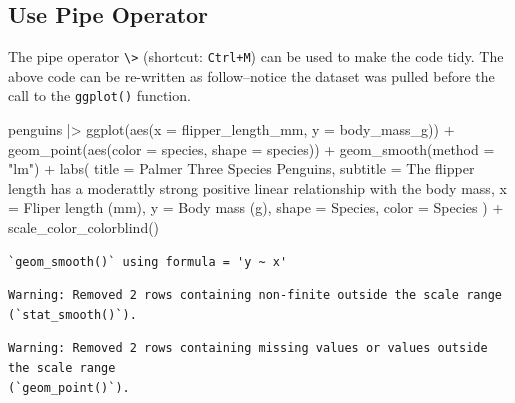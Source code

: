 \documentclass[
  letterpaper,
  DIV=11,
  numbers=noendperiod]{scrreprt}
\newenvironment{Shaded}{\begin{snugshade}}{\end{snugshade}}
\newcommand{\AttributeTok}[1]{\textcolor[rgb]{0.40,0.45,0.13}{#1}}
\newcommand{\FunctionTok}[1]{\textcolor[rgb]{0.28,0.35,0.67}{#1}}
\newcommand{\NormalTok}[1]{\textcolor[rgb]{0.00,0.23,0.31}{#1}}
\newcommand{\SpecialCharTok}[1]{\textcolor[rgb]{0.37,0.37,0.37}{#1}}
\newcommand{\StringTok}[1]{\textcolor[rgb]{0.13,0.47,0.30}{#1}}
\begin{document}
\subsection{Use Pipe Operator}\label{use-pipe-operator}

The pipe operator \texttt{\textbackslash{}\textgreater{}} (shortcut:
\texttt{Ctrl+M}) can be used to make the code tidy. The above code can
be re-written as follow--notice the dataset was pulled before the call
to the \texttt{ggplot()} function.

\begin{Shaded}
\begin{Highlighting}[]
\NormalTok{penguins }\SpecialCharTok{|\textgreater{}}
  \FunctionTok{ggplot}\NormalTok{(}\FunctionTok{aes}\NormalTok{(}\AttributeTok{x =}\NormalTok{ flipper\_length\_mm, }\AttributeTok{y =}\NormalTok{ body\_mass\_g)) }\SpecialCharTok{+}
  \FunctionTok{geom\_point}\NormalTok{(}\FunctionTok{aes}\NormalTok{(}\AttributeTok{color =}\NormalTok{ species, }\AttributeTok{shape =}\NormalTok{ species)) }\SpecialCharTok{+}
  \FunctionTok{geom\_smooth}\NormalTok{(}\AttributeTok{method =} \StringTok{"lm"}\NormalTok{) }\SpecialCharTok{+}
  \FunctionTok{labs}\NormalTok{(}
    \AttributeTok{title =} \StringTok{\textquotesingle{}Palmer Three Species Penguins\textquotesingle{}}\NormalTok{,}
    \AttributeTok{subtitle =} \StringTok{\textquotesingle{}The flipper length has a moderattly strong positive linear relationship with the body mass\textquotesingle{}}\NormalTok{,}
    \AttributeTok{x =} \StringTok{\textquotesingle{}Fliper length (mm)\textquotesingle{}}\NormalTok{,}
    \AttributeTok{y =} \StringTok{\textquotesingle{}Body mass (g)\textquotesingle{}}\NormalTok{,}
    \AttributeTok{shape =} \StringTok{\textquotesingle{}Species\textquotesingle{}}\NormalTok{,}
    \AttributeTok{color =} \StringTok{\textquotesingle{}Species\textquotesingle{}}
\NormalTok{  ) }\SpecialCharTok{+}
  \FunctionTok{scale\_color\_colorblind}\NormalTok{()}
\end{Highlighting}
\end{Shaded}

\begin{verbatim}
`geom_smooth()` using formula = 'y ~ x'
\end{verbatim}

\begin{verbatim}
Warning: Removed 2 rows containing non-finite outside the scale range
(`stat_smooth()`).
\end{verbatim}

\begin{verbatim}
Warning: Removed 2 rows containing missing values or values outside the scale range
(`geom_point()`).
\end{verbatim}
\end{document}

